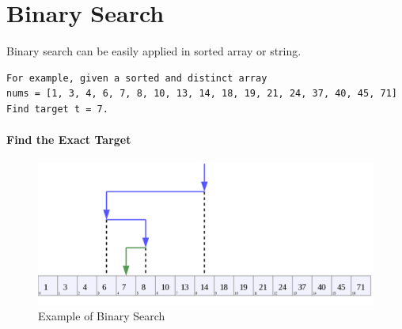 \documentclass[main.tex]{subfiles}
\begin{document}
  
\section{Binary Search}
Binary search can be easily applied in sorted array or string. 
\begin{lstlisting}[numbers=none]
For example, given a sorted and distinct array
nums = [1, 3, 4, 6, 7, 8, 10, 13, 14, 18, 19, 21, 24, 37, 40, 45, 71]
Find target t = 7.
\end{lstlisting}
\paragraph{Find the Exact Target}
\begin{figure}[H]
    \centering
    \includegraphics[width=0.7\columnwidth]{fig/Binary_Search_Depiction.png}
    \caption{Example of Binary Search}
    \label{fig:binary_search_eg_1}
\end{figure}
\end{document}
